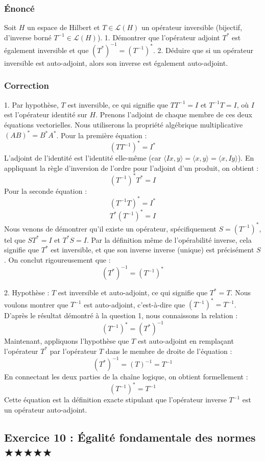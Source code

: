 \documentclass[11pt,a4paper]{article}
\begin{document}
\subsubsection*{Énoncé}
Soit $H$ un espace de Hilbert et $T \in \mathcal{L}(H)$ un opérateur inversible (bijectif, d'inverse borné $T^{-1} \in \mathcal{L}(H)$).
1. Démontrer que l'opérateur adjoint $T^*$ est également inversible et que $(T^*)^{-1} = (T^{-1})^*$.
2. Déduire que si un opérateur inversible est auto-adjoint, alors son inverse est également auto-adjoint.

\subsubsection*{Correction}
1. Par hypothèse, $T$ est inversible, ce qui signifie que $T T^{-1} = I$ et $T^{-1} T = I$, où $I$ est l'opérateur identité sur $H$.
Prenons l'adjoint de chaque membre de ces deux équations vectorielles. Nous utiliserons la propriété algébrique multiplicative $(AB)^* = B^*A^*$.
Pour la première équation :
$$ (T T^{-1})^* = I^* $$
L'adjoint de l'identité est l'identité elle-même (car $\langle Ix, y \rangle = \langle x, y \rangle = \langle x, Iy \rangle$). En appliquant la règle d'inversion de l'ordre pour l'adjoint d'un produit, on obtient :
$$ (T^{-1})^* T^* = I $$
Pour la seconde équation :
$$ (T^{-1} T)^* = I^* $$
$$ T^* (T^{-1})^* = I $$
Nous venons de démontrer qu'il existe un opérateur, spécifiquement $S = (T^{-1})^*$, tel que $S T^* = I$ et $T^* S = I$.
Par la définition même de l'opérabilité inverse, cela signifie que $T^*$ est inversible, et que son inverse inverse (unique) est précisément $S$.
On conclut rigoureusement que :
$$ (T^*)^{-1} = (T^{-1})^* $$

2. Hypothèse : $T$ est inversible et auto-adjoint, ce qui signifie que $T^* = T$.
Nous voulons montrer que $T^{-1}$ est auto-adjoint, c'est-à-dire que $(T^{-1})^* = T^{-1}$.
D'après le résultat démontré à la question 1, nous connaissons la relation :
$$ (T^{-1})^* = (T^*)^{-1} $$
Maintenant, appliquons l'hypothèse que $T$ est auto-adjoint en remplaçant l'opérateur $T^*$ par l'opérateur $T$ dans le membre de droite de l'équation :
$$ (T^*)^{-1} = (T)^{-1} = T^{-1} $$
En connectant les deux parties de la chaîne logique, on obtient formellement :
$$ (T^{-1})^* = T^{-1} $$
Cette équation est la définition exacte stipulant que l'opérateur inverse $T^{-1}$ est un opérateur auto-adjoint.


\subsection*{Exercice 10 : Égalité fondamentale des normes $\bigstar\bigstar\bigstar\bigstar\bigstar$}
\end{document}

